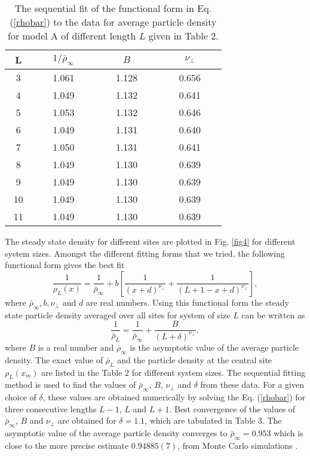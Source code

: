 \documentclass[11pt,a4paper]{book}
\begin{document}
\begin{table}
  \begin{center}
    \begin{tabular}{|c|c|c|c|}
      \hline
      ~L~ & $1/\bar{\rho}_\infty$ & $B$ & $\nu_\perp$ \\
      \hline
      \hline
      3 & ~ ~ 1.061 ~ ~ & ~ ~ 1.128 ~ ~ & ~ ~ 0.656 ~ ~ \\
      \hline
      4 & 1.049 & 1.132 & 0.641 \\
      \hline
      5 & 1.053 & 1.132 & 0.646 \\
      \hline
      6 & 1.049 & 1.131 & 0.640 \\
      \hline
      7 & 1.050 & 1.131 & 0.641 \\
      \hline
      8 & 1.049 & 1.130 & 0.639 \\
      \hline
      9 & 1.049 & 1.130 & 0.639 \\
      \hline
      10 & 1.049 & 1.130 & 0.639 \\
      \hline
      11 & 1.049 & 1.130 & 0.639 \\
      \hline
    \end{tabular}
    \caption{The sequential fit of the functional form in Eq. (\ref{rhobar}) to the
    data for average particle density for model A of different length $L$ given in Table $2$.}
  \end{center}
  \label{third}
\end{table}


The steady state density for different sites
are plotted in Fig. \ref{fig4} for different system sizes.
Amongst the different fitting forms that we tried,  the following 
functional form gives the best fit
\begin{equation}
  \frac{1}{\rho_L(x)} = \frac{1}{\bar{\rho}_\infty} + b[\frac{1}{(x+d)^{\nu_\perp}} + \frac{1}{(L+1-x+d)^{\nu_\perp}}],
\end{equation}
where $\bar{\rho}_\infty, b, \nu_\perp$ and $d$ are real numbers. 
Using this functional form the steady state particle density
averaged over all sites for system of size $L$ can be written as
\begin{equation}
  \frac{1}{\bar{\rho}_L} = \frac{1}{\bar{\rho}_\infty} + \frac{B}{(L+\delta)^{\nu_\perp}},
  \label{rhobar}
\end{equation}
where $B$ is a real number and $\bar{\rho}_\infty$
is the asymptotic value of the average particle density.
The exact value of $\bar{\rho}_L$ and the particle density
at the central site $\rho_L(x_m)$ are listed in the Table $2$
for different system sizes. 
The sequential fitting method is used to find the values of 
$\bar{\rho}_\infty$, $B$, $\nu_\perp$ and $\delta$ from these data. For a given choice
of $\delta$, these values are obtained numerically by solving the Eq. (\ref{rhobar})
for three consecutive lengths $L-1$, $L$ and $L+1$. Best
convergence of the values of $\bar{\rho}_\infty$, $B$ and $\nu_\perp$ are obtained for
$\delta=1.1$, which are tabulated in Table $3$.
The asymptotic value of the average particle density
converges to $\bar{\rho}_\infty =0.953$ which is close
to the more precise estimate $0.94885(7)$, from Monte 
Carlo simulations  \cite{dickman1}.
\end{document}
